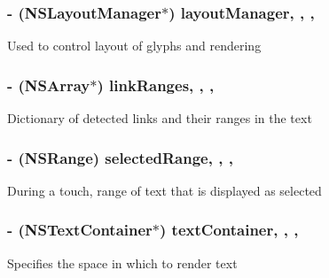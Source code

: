 \subsubsection[{layout\+Manager}]{\setlength{\rightskip}{0pt plus 5cm}-\/ (N\+S\+Layout\+Manager$\ast$) layout\+Manager\hspace{0.3cm}{\ttfamily [read]}, {\ttfamily [write]}, {\ttfamily [nonatomic]}, {\ttfamily [retain]}}\label{category_k_i_label_07_08_acda5870155173d7ec0f25ed7c63db604}
Used to control layout of glyphs and rendering \hypertarget{category_k_i_label_07_08_ab0294bf67c45caebe3f39e778be17c95}{}
\subsubsection[{link\+Ranges}]{\setlength{\rightskip}{0pt plus 5cm}-\/ (N\+S\+Array$\ast$) link\+Ranges\hspace{0.3cm}{\ttfamily [read]}, {\ttfamily [write]}, {\ttfamily [nonatomic]}, {\ttfamily [copy]}}\label{category_k_i_label_07_08_ab0294bf67c45caebe3f39e778be17c95}
Dictionary of detected links and their ranges in the text \hypertarget{category_k_i_label_07_08_af61ee72f15d84bb0f5869ce60f58537f}{}
\subsubsection[{selected\+Range}]{\setlength{\rightskip}{0pt plus 5cm}-\/ (N\+S\+Range) selected\+Range\hspace{0.3cm}{\ttfamily [read]}, {\ttfamily [write]}, {\ttfamily [nonatomic]}, {\ttfamily [assign]}}\label{category_k_i_label_07_08_af61ee72f15d84bb0f5869ce60f58537f}
During a touch, range of text that is displayed as selected \hypertarget{category_k_i_label_07_08_a96015e7fd5df9ce588977b0ac889fef2}{}
\subsubsection[{text\+Container}]{\setlength{\rightskip}{0pt plus 5cm}-\/ (N\+S\+Text\+Container$\ast$) text\+Container\hspace{0.3cm}{\ttfamily [read]}, {\ttfamily [write]}, {\ttfamily [nonatomic]}, {\ttfamily [retain]}}\label{category_k_i_label_07_08_a96015e7fd5df9ce588977b0ac889fef2}
Specifies the space in which to render text \hypertarget{category_k_i_label_07_08_aaf49e47faa508062539d05e77394e64b}{}
